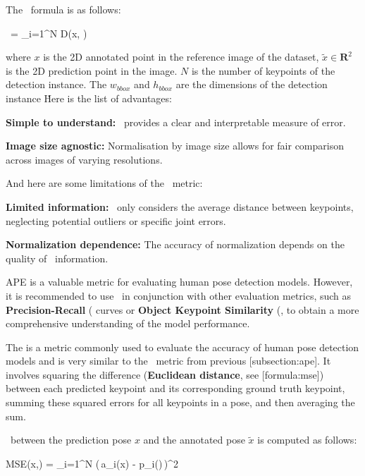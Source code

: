 The \APE\ formula is as follows:

\startplaceformula[reference=formula:ape]
 \startformula \APE\ =  \sum_{i=1}^{N} D(x, ) 
 \stopformula
\stopplaceformula

where $ x $ is the 2D annotated point in the reference image of the dataset, $ \tilde{x} \in \mathbf R^2 $ is the 2D prediction point in the image. $ N $ is the number of keypoints of the detection instance. The $ w_{bbox} $ and $ h_{bbox} $ are the dimensions of the detection instance \BBOX\.

Here is the list of advantages:
\startitemize[1]
 \item {\bf Simple to understand:} \APE\ provides a clear and interpretable measure of error.
 \item {\bf Image size agnostic:} Normalisation by image size allows for fair comparison across images of varying resolutions.
\stopitemize

And here are some limitations of the \APE\ metric:
\startitemize[1]
 \item {\bf Limited information:} \APE\ only considers the average distance between keypoints, neglecting potential outliers or specific joint errors.
 \item {\bf Normalization dependence:} The accuracy of normalization depends on the quality of \BBOX\ information.
\stopitemize

APE is a valuable metric for evaluating human pose detection models. However, it is recommended to use \APE\ in conjunction with other evaluation metrics, such as {\bf Precision-Recall} (\PR\) curves or {\bf Object Keypoint Similarity} (\OKS\), to obtain a more comprehensive understanding of the model performance.

The {\bf \MSE} is a metric commonly used to evaluate the accuracy of human pose detection models and is very similar to the \APE\ metric from previous [subsection:ape]. It involves squaring the difference ({\bf Euclidean distance}, see [formula:mse]) between each predicted keypoint and its corresponding ground truth keypoint, summing these squared errors for all keypoints in a pose, and then averaging the sum.

\MSE\ between the prediction pose $ x $ and the annotated pose $ \tilde{x}$ is computed as follows:

\startplaceformula[reference=formula:mse]
 \startformula MSE(x,) =  \sum_{i=1}^{N} (\,a_i(x) - p_i()\,)^{2}
 \stopformula
\stopplaceformula

